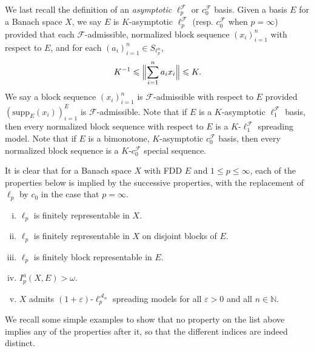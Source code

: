\documentclass[12pt]{amsart}
\theoremstyle{definition}
\newcommand{\nn}{\mathbb{N}}
\newcommand{\aaa}{\mathcal{A}}
\newcommand{\fff}{\mathcal{F}}
\newcommand{\supp}{\mathrm{supp}}
\begin{document}
We last recall the definition of an \emph{asymptotic} $\ell_p^\fff$ or $c_0^\fff$ basis.   Given a basis $E$ for a Banach space $X$, we say $E$ is $K$-asymptotic $\ell_p^\fff$ (resp. $c_0^\fff$ when $p=\infty$) provided that each $\fff$-admissible, normalized block sequence $(x_i)_{i=1}^n$ with respect to $E$, and for each $(a_i)_{i=1}^n\in S_{\ell_p^n}$, $$K^{-1}\leqslant \Bigl\|\sum_{i=1}^n a_ix_i\Bigr\|\leqslant K.$$  We say a block sequence $(x_i)_{i=1}^n$ is $\fff$-admissible with respect to $E$ provided $(\supp_E(x_i))_{i=1}^E$ is $\fff$-admissible.  Note that if $E$ is a $K$-asymptotic $\ell_1^\fff$ basis, then every normalized block sequence with respect to $E$ is a $K$-$\ell_1^\fff$ spreading model.  Note that if $E$ is a bimonotone, $K$-asymptotic $c_0^\fff$ basis, then every normalized block sequence is a $K$-$c_0^\fff$ special sequence.  



It is clear that for a Banach space $X$ with FDD $E$ and $1\leqslant p\leqslant \infty$, each of the properties below is implied by the successive properties, with the replacement of $\ell_p$ by $c_0$ in the case that $p=\infty$.  

\begin{enumerate}[(i)]\item $\ell_p$ is finitely representable in $X$. \item $\ell_p$ is finitely representable in $X$ on disjoint blocks of $E$.  \item $\ell_p$ is finitely block representable in $E$.  \item $I^a_p(X, E)>\omega$. \item $X$ admits $(1+\varepsilon)$-$\ell_p^{\aaa_n}$ spreading models for all $\varepsilon>0$ and all $n\in \nn$.  \end{enumerate} 

We recall some simple examples to show that no property on the list above implies any of the properties after it, so that the different indices are indeed distinct.  
\end{document}
